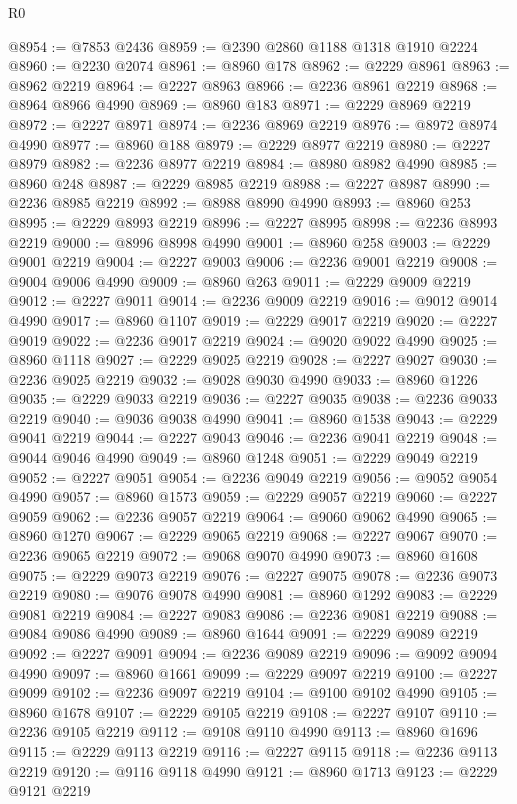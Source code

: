 \begin{lexlean}{R0}
\begin{coremodule}
@8954 := @7853 @2436
@8959 := @2390 @2860 @1188 @1318 @1910 @2224
@8960 := @2230 @2074
@8961 := @8960 @178
@8962 := @2229 @8961
@8963 := @8962 @2219
@8964 := @2227 @8963
@8966 := @2236 @8961 @2219
@8968 := @8964 @8966 @4990
@8969 := @8960 @183
@8971 := @2229 @8969 @2219
@8972 := @2227 @8971
@8974 := @2236 @8969 @2219
@8976 := @8972 @8974 @4990
@8977 := @8960 @188
@8979 := @2229 @8977 @2219
@8980 := @2227 @8979
@8982 := @2236 @8977 @2219
@8984 := @8980 @8982 @4990
@8985 := @8960 @248
@8987 := @2229 @8985 @2219
@8988 := @2227 @8987
@8990 := @2236 @8985 @2219
@8992 := @8988 @8990 @4990
@8993 := @8960 @253
@8995 := @2229 @8993 @2219
@8996 := @2227 @8995
@8998 := @2236 @8993 @2219
@9000 := @8996 @8998 @4990
@9001 := @8960 @258
@9003 := @2229 @9001 @2219
@9004 := @2227 @9003
@9006 := @2236 @9001 @2219
@9008 := @9004 @9006 @4990
@9009 := @8960 @263
@9011 := @2229 @9009 @2219
@9012 := @2227 @9011
@9014 := @2236 @9009 @2219
@9016 := @9012 @9014 @4990
@9017 := @8960 @1107
@9019 := @2229 @9017 @2219
@9020 := @2227 @9019
@9022 := @2236 @9017 @2219
@9024 := @9020 @9022 @4990
@9025 := @8960 @1118
@9027 := @2229 @9025 @2219
@9028 := @2227 @9027
@9030 := @2236 @9025 @2219
@9032 := @9028 @9030 @4990
@9033 := @8960 @1226
@9035 := @2229 @9033 @2219
@9036 := @2227 @9035
@9038 := @2236 @9033 @2219
@9040 := @9036 @9038 @4990
@9041 := @8960 @1538
@9043 := @2229 @9041 @2219
@9044 := @2227 @9043
@9046 := @2236 @9041 @2219
@9048 := @9044 @9046 @4990
@9049 := @8960 @1248
@9051 := @2229 @9049 @2219
@9052 := @2227 @9051
@9054 := @2236 @9049 @2219
@9056 := @9052 @9054 @4990
@9057 := @8960 @1573
@9059 := @2229 @9057 @2219
@9060 := @2227 @9059
@9062 := @2236 @9057 @2219
@9064 := @9060 @9062 @4990
@9065 := @8960 @1270
@9067 := @2229 @9065 @2219
@9068 := @2227 @9067
@9070 := @2236 @9065 @2219
@9072 := @9068 @9070 @4990
@9073 := @8960 @1608
@9075 := @2229 @9073 @2219
@9076 := @2227 @9075
@9078 := @2236 @9073 @2219
@9080 := @9076 @9078 @4990
@9081 := @8960 @1292
@9083 := @2229 @9081 @2219
@9084 := @2227 @9083
@9086 := @2236 @9081 @2219
@9088 := @9084 @9086 @4990
@9089 := @8960 @1644
@9091 := @2229 @9089 @2219
@9092 := @2227 @9091
@9094 := @2236 @9089 @2219
@9096 := @9092 @9094 @4990
@9097 := @8960 @1661
@9099 := @2229 @9097 @2219
@9100 := @2227 @9099
@9102 := @2236 @9097 @2219
@9104 := @9100 @9102 @4990
@9105 := @8960 @1678
@9107 := @2229 @9105 @2219
@9108 := @2227 @9107
@9110 := @2236 @9105 @2219
@9112 := @9108 @9110 @4990
@9113 := @8960 @1696
@9115 := @2229 @9113 @2219
@9116 := @2227 @9115
@9118 := @2236 @9113 @2219
@9120 := @9116 @9118 @4990
@9121 := @8960 @1713
@9123 := @2229 @9121 @2219

\end{coremodule}
\end{lexlean}
